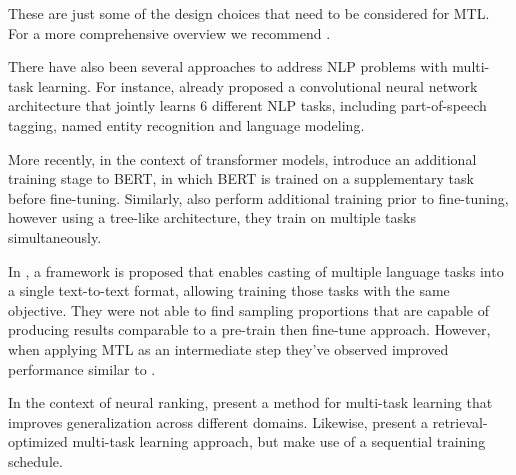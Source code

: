 These are just some of the design choices that need to be considered for MTL. For a more comprehensive overview we recommend \citep{DBLP:journals/corr/abs-2109-09138, DBLP:journals/corr/abs-2007-16008}.

There have also been several approaches to address NLP problems with multi-task learning. For instance, \citep{10.1145/1390156.1390177} already proposed a convolutional neural network architecture that jointly learns 6 different NLP tasks, including part-of-speech tagging, named entity recognition and language modeling.

More recently, in the context of transformer models, \citet{DBLP:journals/corr/abs-1811-01088} introduce an additional training stage to BERT, in which BERT is trained on a supplementary task before fine-tuning. Similarly, \citet{DBLP:journals/corr/abs-1901-11504} also perform additional training prior to fine-tuning, however using a tree-like architecture, they train on multiple tasks simultaneously.

In \citep{DBLP:journals/corr/abs-1910-10683}, a framework is proposed that enables casting of multiple language tasks into a single text-to-text format, allowing training those tasks with the same objective. They were not able to find sampling proportions that are capable of producing results comparable to a pre-train then fine-tune approach. However, when applying MTL as an intermediate step they've observed improved performance similar to \citet{DBLP:journals/corr/abs-1901-11504}.

In the context of neural ranking, \citet{maillard-etal-2021-multi} present a method for multi-task learning that improves generalization across different domains. Likewise, \citet{Fun2021EfficientRO} present a retrieval-optimized multi-task learning approach, but make use of a sequential training schedule.